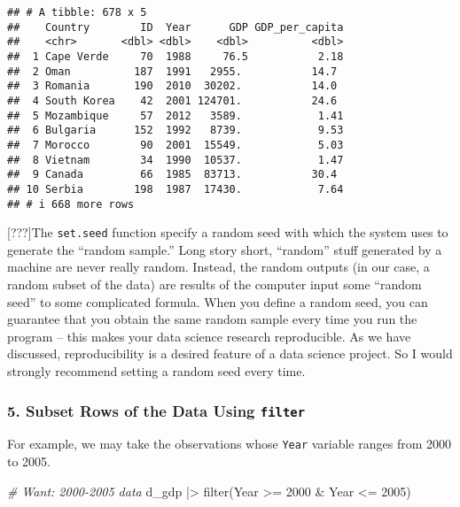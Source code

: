 \documentclass[
]{article}
\newenvironment{Shaded}{\begin{snugshade}}{\end{snugshade}}
\newcommand{\CommentTok}[1]{\textcolor[rgb]{0.56,0.35,0.01}{\textit{#1}}}
\newcommand{\DecValTok}[1]{\textcolor[rgb]{0.00,0.00,0.81}{#1}}
\newcommand{\FunctionTok}[1]{\textcolor[rgb]{0.00,0.00,0.00}{#1}}
\newcommand{\NormalTok}[1]{#1}
\newcommand{\SpecialCharTok}[1]{\textcolor[rgb]{0.00,0.00,0.00}{#1}}
\begin{document}
\begin{verbatim}
## # A tibble: 678 x 5
##    Country        ID  Year      GDP GDP_per_capita
##    <chr>       <dbl> <dbl>    <dbl>          <dbl>
##  1 Cape Verde     70  1988     76.5           2.18
##  2 Oman          187  1991   2955.           14.7 
##  3 Romania       190  2010  30202.           14.0 
##  4 South Korea    42  2001 124701.           24.6 
##  5 Mozambique     57  2012   3589.            1.41
##  6 Bulgaria      152  1992   8739.            9.53
##  7 Morocco        90  2001  15549.            5.03
##  8 Vietnam        34  1990  10537.            1.47
##  9 Canada         66  1985  83713.           30.4 
## 10 Serbia        198  1987  17430.            7.64
## # i 668 more rows
\end{verbatim}

{[}???{]}The \texttt{set.seed} function specify a random seed with which
the system uses to generate the ``random sample.'' Long story short,
``random'' stuff generated by a machine are never really random.
Instead, the random outputs (in our case, a random subset of the data)
are results of the computer input some ``random seed'' to some
complicated formula. When you define a random seed, you can guarantee
that you obtain the same random sample every time you run the program --
this makes your data science research reproducible. As we have
discussed, reproducibility is a desired feature of a data science
project. So I would strongly recommend setting a random seed every time.

\hypertarget{subset-rows-of-the-data-using-filter}{%
\subsubsection{\texorpdfstring{5. Subset Rows of the Data Using
\texttt{filter}}{5. Subset Rows of the Data Using filter}}\label{subset-rows-of-the-data-using-filter}}

For example, we may take the observations whose \texttt{Year} variable
ranges from 2000 to 2005.

\begin{Shaded}
\begin{Highlighting}[]
\CommentTok{\# Want: 2000{-}2005 data}
\NormalTok{d\_gdp }\SpecialCharTok{|\textgreater{}} \FunctionTok{filter}\NormalTok{(Year }\SpecialCharTok{\textgreater{}=} \DecValTok{2000} \SpecialCharTok{\&}\NormalTok{ Year }\SpecialCharTok{\textless{}=} \DecValTok{2005}\NormalTok{)}
\end{Highlighting}
\end{Shaded}
\end{document}
